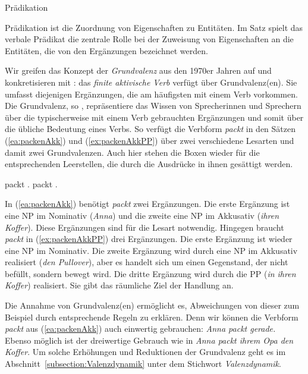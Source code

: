 \begin{Definition}{Prädikation}\label{Def_Prädikation}
    
\noindent 
Prädikation ist die Zuordnung von Eigenschaften zu Entitäten. Im Satz spielt das verbale Prädikat die zentrale Rolle bei der Zuweisung von Eigenschaften an die Entitäten, die von den Ergänzungen bezeichnet werden. 
\end{Definition}



Wir greifen das Konzept der \textit{Grundvalenz} aus den 1970er Jahren auf und konkretisieren mit \citet[122]{Welke2011}: das \textit{finite aktivische Verb} verfügt über Grundvalenz(en). Sie umfasst diejenigen Ergänzungen, die am häufigsten mit einem Verb vorkommen. Die Grundvalenz, so \citet[63]{Welke1988}, repräsentiere das Wissen von Sprecherinnen und Sprechern über die typischerweise mit einem Verb gebrauchten Ergänzungen und somit über die übliche Bedeutung eines Verbs. So verfügt die Verbform \textit{packt} in den Sätzen (\ref{ea:packenAkk}) und (\ref{ex:packenAkkPP}) über zwei verschiedene Lesarten und damit zwei Grundvalenzen. Auch hier stehen die Boxen wieder für die entsprechenden Leerstellen, die durch die Ausdrücke in ihnen gesättigt werden.

\ea
\ea \label{ea:packenAkk}  packt .
\ex \label{ex:packenAkkPP}  packt  .
\z
\z 

In (\ref{ea:packenAkk}) benötigt \textit{packt} zwei Ergänzungen. Die erste Ergänzung ist eine NP im Nominativ (\textit{Anna}) und die zweite eine NP im Akkusativ (\textit{ihren Koffer}). Diese Ergänzungen sind für die Lesart  notwendig. Hingegen braucht \textit{packt} in (\ref{ex:packenAkkPP}) drei Ergänzungen. Die erste Ergänzung ist wieder eine NP im Nominativ. Die zweite Ergänzung wird durch eine NP im Akkusativ realisiert (\textit{den Pullover}), aber es handelt sich um einen Gegenstand, der nicht befüllt, sondern bewegt wird. Die dritte Ergänzung wird durch die PP (\textit{in ihren Koffer}) realisiert. Sie gibt das räumliche Ziel der Handlung an. 

Die Annahme von Grundvalenz(en) ermöglicht es, Abweichungen von dieser zum Beispiel durch entsprechende Regeln zu erklären. Denn wir können die Verbform \textit{packt} aus (\ref{ea:packenAkk}) auch einwertig gebrauchen: \textit{Anna packt gerade.} Ebenso möglich ist der dreiwertige Gebrauch wie in \textit{Anna packt ihrem Opa den Koffer}. Um solche Erhöhungen und Reduktionen der Grundvalenz geht es im Abschnitt~\ref{subsection:Valenzdynamik} unter dem Stichwort \textit{Valenzdynamik}. 

